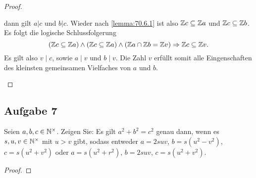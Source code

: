 \begin{proof}
\begin{enumerate}[label=\alph*)]
          dann gilt $a | c$ und $b | c$.
          Wieder nach \autoref{lemma:70.6.1} ist also
          $\mathbb{Z}{}c \subseteq \mathbb{Z}{}a$ und
          $\mathbb{Z}{}c \subseteq \mathbb{Z}{}b$.
          Es folgt die logische Schlussfolgerung
          \begin{equation*}
            (\mathbb{Z}{}c \subseteq \mathbb{Z}{}a) \wedge
            (\mathbb{Z}{}c \subseteq \mathbb{Z}{}a) \wedge
            (\mathbb{Z}{}a \cap \mathbb{Z}{}b = \mathbb{Z}{}v)
            \Rightarrow \mathbb{Z}{}c \subseteq \mathbb{Z}{}v.
          \end{equation*}
          Es gilt also $v \mid c$, sowie $a \mid v$ und $b \mid v$.
          Die Zahl $v$ erfüllt somit alle Eingenschaften des
          kleinsten gemeinsamen Vielfaches von $a$ und $b$.
  \end{enumerate}
\end{proof}

\subsection{Aufgabe 7}
Seien $a,b,c \in \mathbb{N}^\times$. Zeigen Sie: Es gilt $a^2 + b^2 = c^2$ genau dann,
wenn es $s,u,v \in \mathbb{N}^\times$ mit $u > v$ gibt, sodass entweder
$a = 2suv$, $b = s(u^2 - v^2)$, $c = s(u^2 + v^2)$ oder
$a = s(u^2 + r^2)$, $b = 2suv$, $c = s(u^2 + v^2)$.
\begin{proof}
\end{proof}
